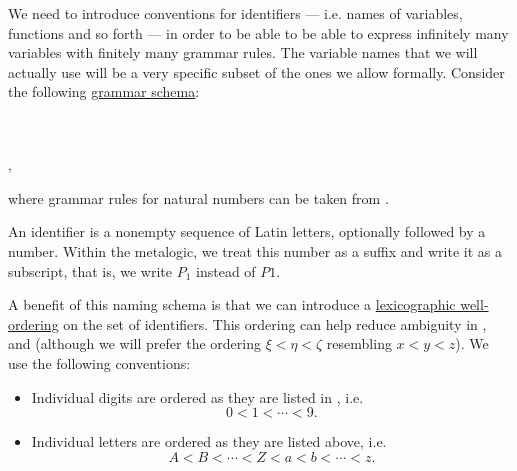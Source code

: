 \begin{remark}\label{rem:grammar_rules_for_variables}
  We need to introduce conventions for identifiers --- i.e. names of variables, functions and so forth --- in order to be able to be able to express infinitely many variables with finitely many grammar rules. The variable names that we will actually use will be a very specific subset of the ones we allow formally. Consider the following \hyperref[def:formal_grammar/schema]{grammar schema}:
  \begin{bnf*}
           { \bnfor {} \bnfor \cdots \bnfor {} \bnfor {} \bnfor {} \bnfor \cdots \bnfor {}} \\
             { \bnfor {} \bnfsp {}} \\
       { \bnfor {} \bnfsp {}},
  \end{bnf*}
  where grammar rules for natural numbers can be taken from .

  An identifier is a nonempty sequence of Latin letters, optionally followed by a number. Within the metalogic, we treat this number as a suffix and write it as a subscript, that is, we write \( P_1 \) instead of \( P1 \).

  A benefit of this naming schema is that we can introduce a \hyperref[thm:def:well_ordered_set/lexicographic]{lexicographic well-ordering} on the set of identifiers. This ordering can help reduce ambiguity in ,  and  (although we will prefer the ordering \( \xi < \eta < \zeta \) resembling \( x < y < z \)). We use the following conventions:
  \begin{itemize}
    \item Individual digits are ordered as they are listed in , i.e.
    \begin{equation*}
      0 < 1 < \cdots < 9.
    \end{equation*}

    \item Individual letters are ordered as they are listed above, i.e.
    \begin{equation*}
      A < B < \cdots < Z < a < b < \cdots < z.
    \end{equation*}


\end{itemize}
\end{remark}
